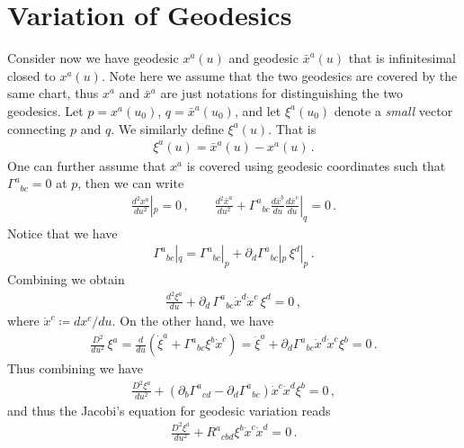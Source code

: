 \documentclass[11pt, onesided]{book}
\theoremstyle{break}
\theoremstyle{break}
\newcommand{\pd}{\partial}
\begin{document}
\section[Variation of Geodesics]{\color{red} Variation of Geodesics\color{black}}
Consider now we have geodesic $x^a(u)$ and geodesic $\bar{x}^a(u)$ that is infinitesimal closed to $x^a(u)$. Note here we assume that the two geodesics are covered by the same chart, thus $x^a$ and $\bar{x}^a$ are just notations for distinguishing the two geodesics. Let $p=x^a(u_0)$, $q = \bar{x}^a(u_0)$, and let $\xi^a(u_0)$ denote a \textit{small} vector connecting $p$ and $q$. We similarly define $\xi^a(u)$. That is
\begin{align*}
\xi^a(u) = \bar{x}^a(u) - x^a(u)\,.
\end{align*}
One can further assume that $x^a$ is covered using geodesic coordinates such that $\Gamma^a{}_{bc} = 0$ at $p$, then we can write
\begin{align*}
\frac{d^2 x^a}{du^2}|_p = 0\,,\qquad
\frac{d^2 \bar{x}^a}{du^2} + \Gamma^a{}_{bc} \frac{d\bar{x}^b}{du}\frac{d\bar{x}^c}{du}|_q = 0\,.
\end{align*}
Notice that we have
\begin{align*}
\Gamma^a{}_{bc}|_q = \Gamma^a{}_{bc}|_p + \pd_d \Gamma^a{}_{bc}|_p \, \xi^d|_p\,.
\end{align*}
Combining we obtain
\begin{align*}
\frac{d^2 \xi^a}{du} + \pd_d \, \Gamma^a{}_{bc} \dot{x}^d \dot{x}^c \, \xi^d = 0\,,
\end{align*}
where $\dot{x}^c \coloneqq dx^c/du$. On the other hand, we have
\begin{align*}
\frac{D^2}{du^2}\, \xi^a = \frac{d}{du}\left( \dot{\xi}^a + \Gamma^a{}_{bc} \xi^b \dot{x}^c\right) = \ddot{\xi}^a + \pd_d \Gamma^a{}_{bc} \dot{x}^d \dot{x}^c\xi^b = 0\,.
\end{align*}
Thus combining we have
\begin{align*}
\frac{D^2 \xi^a}{du^2} + \left( \pd_b \Gamma^a{}_{cd} - \pd_d \Gamma^a{}_{bc}\right) \dot{x}^c\dot{x}^d \xi^b  =0\,,
\end{align*}
and thus the Jacobi's equation for geodesic variation reads
\begin{align}
\frac{D^2 \xi^a}{du^2} + R^a{}_{cbd} \xi^b \dot{x}^c \dot{x}^d = 0\,.
\end{align}
\end{document}
